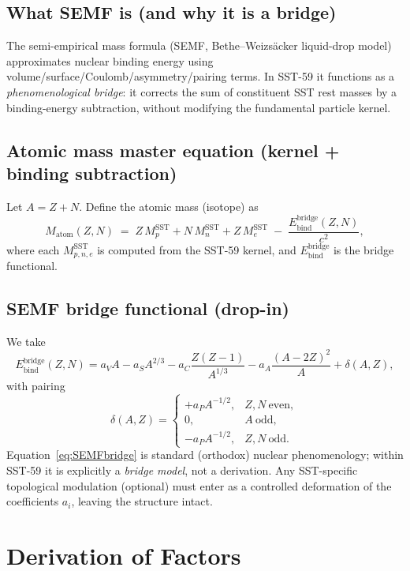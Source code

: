\documentclass[11pt, a4paper]{article}
\begin{document}
\subsection{What SEMF is (and why it is a bridge)}
The semi-empirical mass formula (SEMF, Bethe--Weizs\"acker liquid-drop model) approximates nuclear binding energy using volume/surface/Coulomb/asymmetry/pairing
terms.  In SST-59 it functions as a \emph{phenomenological bridge}: it corrects the sum of constituent SST rest masses by a binding-energy subtraction,
without modifying the fundamental particle kernel.

\subsection{Atomic mass master equation (kernel + binding subtraction)}
Let \(A=Z+N\).  Define the atomic mass (isotope) as
\begin{equation}
M_{\mathrm{atom}}(Z,N)\;=\; Z\,M_p^{\mathrm{SST}} + N\,M_n^{\mathrm{SST}} + Z\,M_e^{\mathrm{SST}}
\;-\;\frac{E_{\mathrm{bind}}^{\mathrm{bridge}}(Z,N)}{c^2},
\label{eq:MatomBridge}
\end{equation}
where each \(M_{p,n,e}^{\mathrm{SST}}\) is computed from the SST-59 kernel, and \(E_{\mathrm{bind}}^{\mathrm{bridge}}\) is the bridge functional.

\subsection{SEMF bridge functional (drop-in)}
We take
\begin{equation}
E_{\mathrm{bind}}^{\mathrm{bridge}}(Z,N)
= a_V A - a_S A^{2/3} - a_C \frac{Z(Z-1)}{A^{1/3}} - a_A\frac{(A-2Z)^2}{A} + \delta(A,Z),
\label{eq:SEMFbridge}
\end{equation}
with pairing
\[
\delta(A,Z)=
\begin{cases}
 +a_P A^{-1/2},& Z,N\ \text{even},\\
 0,& A\ \text{odd},\\
 -a_P A^{-1/2},& Z,N\ \text{odd}.
\end{cases}
\]
Equation~\eqref{eq:SEMFbridge} is standard (orthodox) nuclear phenomenology; within SST-59 it is explicitly a \emph{bridge model}, not a derivation.
Any SST-specific topological modulation (optional) must enter as a controlled deformation of the coefficients \(a_i\), leaving the structure intact.

\section{Derivation of Factors}
\end{document}
